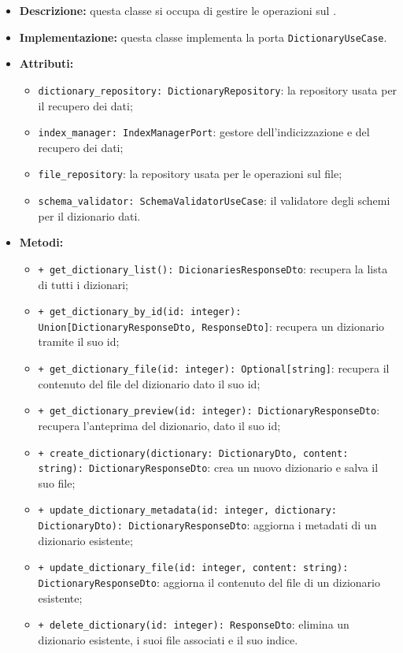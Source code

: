 \begin{itemize}
    \item \textbf{Descrizione:} questa classe si occupa di gestire le operazioni sul . 
    \item \textbf{Implementazione:} questa classe implementa la porta \texttt{DictionaryUseCase}. 
    \item \textbf{Attributi:}
    \begin{itemize}
        \item \texttt{dictionary\_repository: DictionaryRepository}: la repository usata per il recupero dei dati;
        \item \texttt{index\_manager: IndexManagerPort}: gestore dell'indicizzazione e del recupero dei dati;
        \item \texttt{file\_repository}: la repository usata per le operazioni sul file;
        \item \texttt{schema\_validator: SchemaValidatorUseCase}: il validatore degli schemi per il dizionario dati.
    \end{itemize}
    \item \textbf{Metodi:}
    \begin{itemize}
        \item \texttt{+ get\_dictionary\_list(): DicionariesResponseDto}: recupera la lista di tutti i dizionari;
        \item \texttt{+ get\_dictionary\_by\_id(id: integer): Union[DictionaryResponseDto, ResponseDto]}: recupera un dizionario tramite il suo id;
        \item \texttt{+ get\_dictionary\_file(id: integer): Optional[string]}: recupera il contenuto del file del dizionario dato il suo id;
        \item \texttt{+ get\_dictionary\_preview(id: integer): DictionaryResponseDto}: recupera l'anteprima del dizionario, dato il suo id;
        \item \texttt{+ create\_dictionary(dictionary: DictionaryDto, content: string): DictionaryResponseDto}: crea un nuovo dizionario e salva il suo file;
        \item \texttt{+ update\_dictionary\_metadata(id: integer, dictionary: DictionaryDto): DictionaryResponseDto}: aggiorna i metadati di un dizionario esistente;
        \item \texttt{+ update\_dictionary\_file(id: integer, content: string): DictionaryResponseDto}: aggiorna il contenuto del file di un dizionario esistente;
        \item \texttt{+ delete\_dictionary(id: integer): ResponseDto}: elimina un dizionario esistente, i suoi file associati e il suo indice.

\end{itemize}
\end{itemize}
